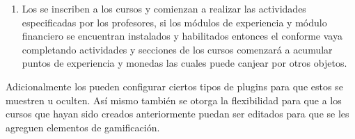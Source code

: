 \begin{enumerate}
  \item Los  se inscriben a los cursos y
        comienzan a realizar las actividades especificadas por los profesores,
        si los módulos de experiencia y módulo financiero se encuentran instalados
        y habilitados entonces el  conforme vaya
        completando actividades y secciones de los cursos comenzará a acumular puntos
        de experiencia y monedas las cuales puede canjear por otros objetos.

 \end{enumerate}

 \noindent 
 Adicionalmente los  pueden configurar ciertos
 tipos de plugins para que estos se muestren u oculten. Así mismo también se otorga
 la flexibilidad para que a los cursos que hayan sido creados anteriormente puedan
 ser editados para que se les agreguen elementos de gamificación.
